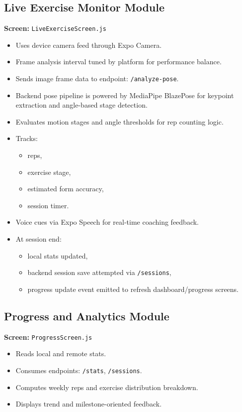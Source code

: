 \documentclass[12pt,a4paper]{article}
\begin{document}
\subsection{Live Exercise Monitor Module}
\textbf{Screen:} \texttt{LiveExerciseScreen.js}
\begin{itemize}[leftmargin=1.2cm]
  \item Uses device camera feed through Expo Camera.
  \item Frame analysis interval tuned by platform for performance balance.
  \item Sends image frame data to endpoint: \texttt{/analyze-pose}.
  \item Backend pose pipeline is powered by MediaPipe BlazePose for keypoint extraction and angle-based stage detection.
  \item Evaluates motion stages and angle thresholds for rep counting logic.
  \item Tracks:
  \begin{itemize}
    \item reps,
    \item exercise stage,
    \item estimated form accuracy,
    \item session timer.
  \end{itemize}
  \item Voice cues via Expo Speech for real-time coaching feedback.
  \item At session end:
  \begin{itemize}
    \item local stats updated,
    \item backend session save attempted via \texttt{/sessions},
    \item progress update event emitted to refresh dashboard/progress screens.
  \end{itemize}
\end{itemize}

\subsection{Progress and Analytics Module}
\textbf{Screen:} \texttt{ProgressScreen.js}
\begin{itemize}[leftmargin=1.2cm]
  \item Reads local and remote stats.
  \item Consumes endpoints: \texttt{/stats}, \texttt{/sessions}.
  \item Computes weekly reps and exercise distribution breakdown.
  \item Displays trend and milestone-oriented feedback.
\end{itemize}
\end{document}
